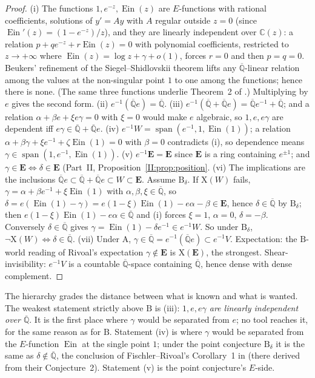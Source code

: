 \documentclass[11pt,a4paper]{article}
\newcommand{\C}{\mathbb C}
\newcommand{\Qbar}{\overline{\mathbb Q}}
\newcommand{\Ein}{\operatorname{Ein}}
\newcommand{\EE}{\mathbf E}
\DeclareMathOperator{\spn}{span}
\theoremstyle{definition}
\theoremstyle{remark}
\numberwithin{equation}{section}
\begin{document}
\begin{proof}
(i) The functions $1,e^{-z},\Ein(z)$ are $E$-functions with rational coefficients,
solutions of $y'=Ay$ with $A$ regular outside $z=0$ (since
$\Ein'(z)=(1-e^{-z})/z$), and they are linearly independent over $\C(z)$: a relation
$p+qe^{-z}+r\Ein(z)=0$ with polynomial coefficients, restricted to $z\to+\infty$ where
$\Ein(z)=\log z+\gamma+o(1)$, forces $r=0$ and then $p=q=0$. Beukers' refinement of
the Siegel--Shidlovskii theorem \cite[Thm.~1.3, Cor.~1.4]{Beukers} lifts any
$\Qbar$-linear relation among the values at the non-singular point $1$ to one among the
functions; hence there is none. (The same three functions underlie Theorem~2 of \cite{Rivoal2012}.)
Multiplying by $e$ gives the second form.
(ii) $e^{-1}(\Qbar e)=\Qbar$.
(iii) $e^{-1}(\Qbar+\Qbar e)=\Qbar e^{-1}+\Qbar$; and a relation
$\alpha+\beta e+\xi e\gamma=0$ with $\xi=0$ would make $e$ algebraic, so
$1,e,e\gamma$ are dependent iff $e\gamma\in\Qbar+\Qbar e$.
(iv) $e^{-1}W=\spn(e^{-1},1,\Ein(1))$; a relation $\alpha+\beta\gamma+\xi e^{-1}+\zeta\Ein(1)=0$
with $\beta=0$ contradicts (i), so dependence means $\gamma\in\spn(1,e^{-1},\Ein(1))$.
(v) $e^{-1}\EE=\EE$ since $\EE$ is a ring containing $e^{\pm1}$; and
$\gamma\in\EE\iff\delta\in\EE$ (Part~II, Proposition~\ref{II:prop:position}.
(vi) The implications are the inclusions $\Qbar e\subset\Qbar+\Qbar e\subset W\subset\EE$.
Assume $\mathrm B_\delta$. If $\mathrm X(W)$ fails, $\gamma=\alpha+\beta e^{-1}+\xi\Ein(1)$
with $\alpha,\beta,\xi\in\Qbar$, so $\delta=e(\Ein(1)-\gamma)=e(1-\xi)\Ein(1)-e\alpha-\beta\in\EE$,
hence $\delta\in\Qbar$ by $\mathrm B_\delta$; then $e(1-\xi)\Ein(1)-e\alpha\in\Qbar$ and
(i) forces $\xi=1$, $\alpha=0$, $\delta=-\beta$. Conversely $\delta\in\Qbar$ gives
$\gamma=\Ein(1)-\delta e^{-1}\in e^{-1}W$. So under $\mathrm B_\delta$,
$\neg\mathrm X(W)\iff\delta\in\Qbar$.
(vii) Under $\mathrm A$, $\gamma\in\Qbar=e^{-1}(\Qbar e)\subset e^{-1}V$. Expectation: the
$\mathrm B$-world reading of Rivoal's expectation $\gamma\notin\EE$ \cite{Rivoal2017} is
$\mathrm X(\EE)$, the strongest. Shear-invisibility: $e^{-1}V$ is a countable
$\Qbar$-space containing $\Qbar$, hence dense with dense complement.
\end{proof}

The hierarchy grades the distance between what is known and what is wanted. The weakest
statement strictly above $\mathrm B$ is (iii): \emph{$1,e,e\gamma$ are linearly
independent over $\Qbar$}. It is the first place where $\gamma$ would be separated from
$e$; no tool reaches it, for the same reason as for $\mathrm B$. Statement (iv) is where
$\gamma$ would be separated from the $E$-function $\Ein$ at the single point $1$; under
the point conjecture $\mathrm B_\delta$ it is the same as $\delta\notin\Qbar$, the
conclusion of Fischler--Rivoal's Corollary~1 in \cite{FRmixed} (there derived from their
Conjecture~2). Statement (v) is the point conjecture's $E$-side.
\end{document}
